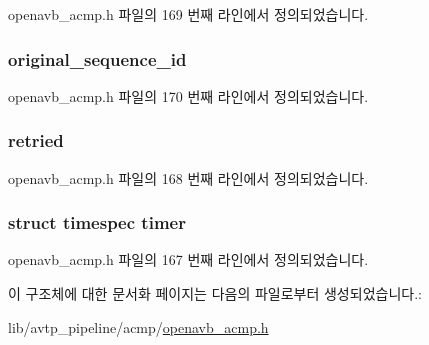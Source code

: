 openavb\+\_\+acmp.\+h 파일의 169 번째 라인에서 정의되었습니다.

\subsubsection[{\texorpdfstring{original\+\_\+sequence\+\_\+id}{original_sequence_id}}]{ original\+\_\+sequence\+\_\+id}\hypertarget{structopenavb__acmp___inflight_command__t_adfbdfa9aa285b3350f4454bc0bf96cb9}{}\label{structopenavb__acmp___inflight_command__t_adfbdfa9aa285b3350f4454bc0bf96cb9}


openavb\+\_\+acmp.\+h 파일의 170 번째 라인에서 정의되었습니다.

\subsubsection[{\texorpdfstring{retried}{retried}}]{ retried}\hypertarget{structopenavb__acmp___inflight_command__t_a21ec179e61e9198072d8818797605bd2}{}\label{structopenavb__acmp___inflight_command__t_a21ec179e61e9198072d8818797605bd2}


openavb\+\_\+acmp.\+h 파일의 168 번째 라인에서 정의되었습니다.

\subsubsection[{\texorpdfstring{timer}{timer}}]{\setlength{\rightskip}{0pt plus 5cm}struct timespec timer}\hypertarget{structopenavb__acmp___inflight_command__t_ab749c97f222e4394a7656539ec08c311}{}\label{structopenavb__acmp___inflight_command__t_ab749c97f222e4394a7656539ec08c311}


openavb\+\_\+acmp.\+h 파일의 167 번째 라인에서 정의되었습니다.



이 구조체에 대한 문서화 페이지는 다음의 파일로부터 생성되었습니다.\+:\begin{DoxyCompactItemize}
\item 
lib/avtp\+\_\+pipeline/acmp/\hyperlink{openavb__acmp_8h}{openavb\+\_\+acmp.\+h}\end{DoxyCompactItemize}

